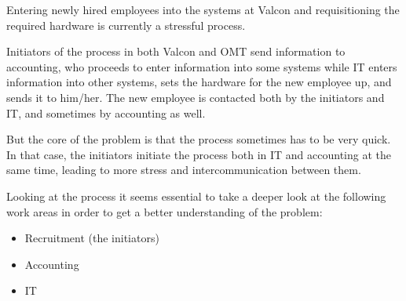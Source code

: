 Entering newly hired employees into the systems at Valcon and requisitioning the required hardware is currently a stressful process.

Initiators of the process in both Valcon and OMT send information to accounting, who proceeds to enter information into some systems while IT enters information into other systems, sets the hardware for the new employee up, and sends it to him/her.
The new employee is contacted both by the initiators and IT, and sometimes by accounting as well.

But the core of the problem is that the process sometimes has to be very quick.
In that case, the initiators initiate the process both in IT and accounting at the same time, leading to more stress and intercommunication between them.

Looking at the process it seems essential to take a deeper look at the following work areas in order to get a better understanding of the problem:
\begin{itemize}
\item Recruitment (the initiators)
\item Accounting
\item IT
\end{itemize}